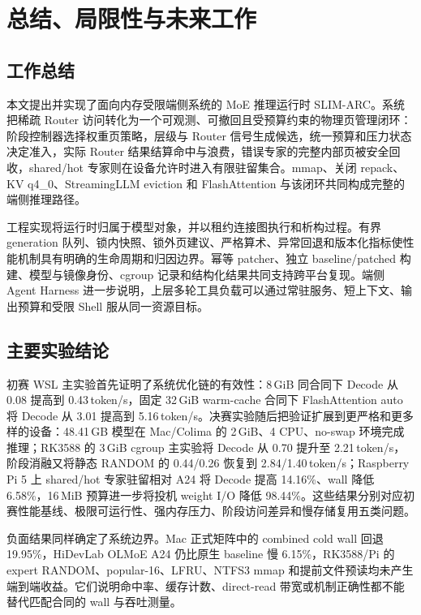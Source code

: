 \section{总结、局限性与未来工作}
\label{sec:conclusion}

\subsection{工作总结}

本文提出并实现了面向内存受限端侧系统的 MoE 推理运行时 SLIM-ARC。系统把稀疏 Router 访问转化为一个可观测、可撤回且受预算约束的物理页管理闭环：阶段控制器选择权重页策略，层级与 Router 信号生成候选，统一预算和压力状态决定准入，实际 Router 结果结算命中与浪费，错误专家的完整内部页被安全回收，shared/hot 专家则在设备允许时进入有限驻留集合。mmap、关闭 repack、KV q4\_0、StreamingLLM eviction 和 FlashAttention 与该闭环共同构成完整的端侧推理路径。

工程实现将运行时归属于模型对象，并以租约连接图执行和析构过程。有界 generation 队列、锁内快照、锁外页建议、严格算术、异常回退和版本化指标使性能机制具有明确的生命周期和归因边界。幂等 patcher、独立 baseline/patched 构建、模型与镜像身份、cgroup 记录和结构化结果共同支持跨平台复现。端侧 Agent Harness 进一步说明，上层多轮工具负载可以通过常驻服务、短上下文、输出预算和受限 Shell 服从同一资源目标。

\subsection{主要实验结论}

初赛 WSL 主实验首先证明了系统优化链的有效性：8\,GiB 同合同下 Decode 从 0.08 提高到 0.43\,token/s，固定 32\,GiB warm-cache 合同下 FlashAttention auto 将 Decode 从 3.01 提高到 5.16\,token/s。决赛实验随后把验证扩展到更严格和更多样的设备：48.41\,GB 模型在 Mac/Colima 的 2\,GiB、4 CPU、no-swap 环境完成推理；RK3588 的 3\,GiB cgroup 主实验将 Decode 从 0.70 提升至 2.21\,token/s，阶段消融又将静态 RANDOM 的 0.44/0.26 恢复到 2.84/1.40\,token/s；Raspberry Pi 5 上 shared/hot 专家驻留相对 A24 将 Decode 提高 14.16\%、wall 降低 6.58\%，16\,MiB 预算进一步将投机 weight I/O 降低 98.44\%。这些结果分别对应初赛性能基线、极限可运行性、强内存压力、阶段访问差异和慢存储复用五类问题。

负面结果同样确定了系统边界。Mac 正式矩阵中的 combined cold wall 回退 19.95\%，HiDevLab OLMoE A24 仍比原生 baseline 慢 6.15\%，RK3588/Pi 的 expert RANDOM、popular-16、LFRU、NTFS3 mmap 和提前文件预读均未产生端到端收益。它们说明命中率、缓存计数、direct-read 带宽或机制正确性都不能替代匹配合同的 wall 与吞吐测量。

